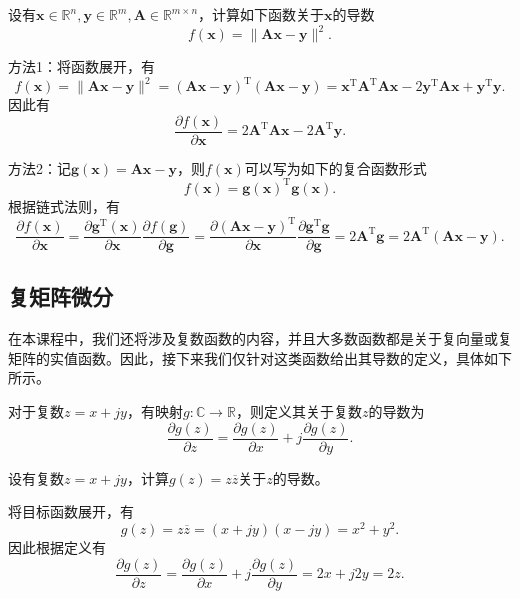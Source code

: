 \begin{example}
    设有\( \bm{x} \in \mathbb{R}^n, \bm{y} \in \mathbb{R}^m, \mathbf{A} \in \mathbb{R}^{m \times n} \)，计算如下函数关于\( \bm{x} \)的导数
    \[
        f(\bm{x}) = \|\mathbf{A}\bm{x} - \bm{y}\|^2.
    \]
\end{example}
\begin{solution}
    方法1：将函数展开，有
    \[
        f(\bm{x}) = \|\mathbf{A}\bm{x} - \bm{y}\|^2 = (\mathbf{A}\bm{x} - \bm{y})^{\mathrm{T}}(\mathbf{A}\bm{x} - \bm{y}) = \bm{x}^{\mathrm{T}} \mathbf{A}^{\mathrm{T}} \mathbf{A} \bm{x} - 2\bm{y}^{\mathrm{T}} \mathbf{A} \bm{x} + \bm{y}^{\mathrm{T}} \bm{y}.
    \]
    因此有
    \[
        \frac{\partial f(\bm{x})}{\partial \bm{x}} = 2 \mathbf{A}^{\mathrm{T}} \mathbf{A} \bm{x} - 2 \mathbf{A}^{\mathrm{T}} \bm{y}.
    \]

    方法2：记\( \mathbf{g}(\bm{x}) = \mathbf{A}\bm{x} - \bm{y} \)，则\( f(\bm{x}) \)可以写为如下的复合函数形式
    \[
        f(\bm{x}) = \mathbf{g}(\bm{x})^{\mathrm{T}} \mathbf{g}(\bm{x}).
    \]
    根据链式法则，有
    \[
        \frac{\partial f(\bm{x})}{\partial \bm{x}} = \frac{\partial \mathbf{g}^{\mathrm{T}}(\bm{x})}{\partial \bm{x}}\frac{\partial f(\mathbf{g})}{\partial \mathbf{g}} = \frac{\partial (\mathbf{A} \bm{x} - \bm{y})^{\mathrm{T}}}{ \partial \bm{x}} \frac{\partial \mathbf{g}^{\mathrm{T}} \mathbf{g}}{\partial \mathbf{g}} = 2 \mathbf{A}^{\mathrm{T}}  \mathbf{g} = 2 \mathbf{A}^{\mathrm{T}} (\mathbf{A}\bm{x} - \bm{y}).
    \]
\end{solution}

\subsection{复矩阵微分}

在本课程中，我们还将涉及复数函数的内容，并且大多数函数都是关于复向量或复矩阵的实值函数。因此，接下来我们仅针对这类函数给出其导数的定义，具体如下所示。

\begin{definition}
    对于复数\( z = x + jy \)，有映射\( g: \mathbb{C} \rightarrow \mathbb{R} \)，则定义其关于复数\( z \)的导数为
    \[
        \frac{\partial g(z)}{\partial z} = \frac{\partial g(z)}{\partial x} + j \frac{\partial g(z)}{\partial y}.
    \]
\end{definition}

\begin{example}
    设有复数\( z = x + jy \)，计算\( g(z) = z \overline{z} \)关于\( z \)的导数。
\end{example}
\begin{solution}
    将目标函数展开，有
    \[
        g(z) = z \overline{z} = (x + jy)(x - jy) = x^2 + y^2.
    \]
    因此根据定义有
    \[
        \frac{\partial g(z)}{\partial z} = \frac{\partial g(z)}{\partial x} + j \frac{\partial g(z)}{\partial y} = 2x + j 2y = 2z.
    \]
\end{solution}

